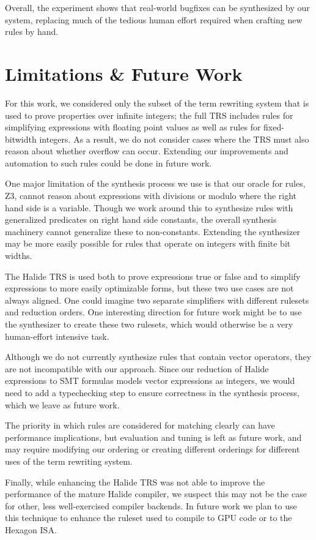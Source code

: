 \documentclass[sigplan,10pt,review,anonymous]{acmart}\settopmatter{printfolios=true,printccs=false,printacmref=false}
\begin{document}
Overall, the experiment shows that real-world bugfixes can be synthesized by
our system, replacing much of the tedious human effort required when crafting
new rules by hand.

\section{Limitations \& Future Work}
For this work, we considered only the subset of the term rewriting system that
is used to prove properties over infinite integers; the full TRS includes rules
for simplifying expressions with floating point values as well as rules for
fixed-bitwidth integers.  As a result, we do not consider cases where the TRS
must also reason about whether overflow can occur.  Extending our improvements
and automation to such rules could be done in future work.

One major limitation of the synthesis process we use is that our oracle
for rules, Z3, cannot reason about expressions with divisions or modulo
where the right hand side is a variable.  Though we work around this to
synthesize rules with generalized predicates on right hand side constants,
the overall synthesis machinery cannot generalize these to non-constants.
Extending the synthesizer may be more easily possible for rules that operate
on integers with finite bit widths.

The Halide TRS is used both to prove expressions true or false and to
simplify expressions to more easily optimizable forms, but these two use cases
are not always aligned. One could imagine two separate simplifiers with
different rulesets and reduction orders. One interesting direction for future
work might be to use the synthesizer to create these two rulesets, which would
otherwise be a very human-effort intensive task.

Although we do not currently synthesize rules that contain vector operators,
they are not incompatible with our approach. Since our reduction of Halide
expressions to SMT formulas models vector expressions as integers, we would need
to add a typechecking step to ensure correctness in the synthesis process, which
we leave as future work.

The priority in which rules are considered for matching clearly can have
performance implications, but evaluation and tuning is left as future work, and
may require modifying our ordering or creating different orderings for different
uses of the term rewriting system.

Finally, while enhancing the Halide TRS was not able to improve the performance of the mature Halide compiler, we suspect this may not be the case for other, less well-exercised compiler backends. In future work we plan to use this technique to enhance the ruleset used to compile to GPU code or to the Hexagon ISA.
\end{document}
